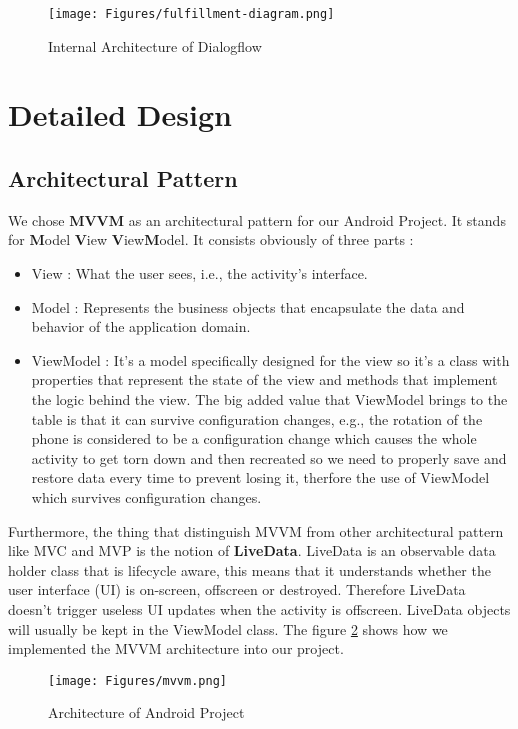 \begin{figure}[H]
\centering
\texttt{[image: Figures/fulfillment-diagram.png]}
\caption{Internal Architecture of Dialogflow}
\label{fig:dialogflow inetrnal}
\end{figure}
\section{Detailed Design}
\subsection{Architectural Pattern}
We chose \textbf{MVVM} as an architectural pattern for our Android Project. It stands for \textbf{M}odel \textbf{V}iew \textbf{V}iew\textbf{M}odel. It consists obviously of three parts : \begin{itemize}
    \item View : What the user sees, i.e., the activity's interface.
    \item Model : Represents the business objects that encapsulate the data and behavior of the application domain.
    \item ViewModel : It's a model specifically designed for the view so it's a class with properties that represent the state of the view and methods that implement the logic behind the view. The big added value that ViewModel brings to the table is that it can survive configuration changes, e.g., the rotation of the phone is considered to be a configuration change which causes the whole activity to get torn down and then recreated so we need to properly save and restore data every time to prevent losing it, therfore the use of ViewModel which survives configuration changes.
\end{itemize}
Furthermore, the thing that distinguish MVVM from other architectural pattern like MVC and MVP is the notion of \textbf{LiveData}. LiveData is an observable data holder class that is lifecycle aware, this means that it understands whether the user interface (UI) is on-screen, offscreen or destroyed. Therefore LiveData doesn't trigger useless UI updates when the activity is offscreen. LiveData objects will usually be kept in the ViewModel class. The figure \ref{fig:mvvm} shows how we implemented the MVVM architecture into our project. 
\begin{figure}[H]
\centering
\texttt{[image: Figures/mvvm.png]}
\caption{Architecture of Android Project}
\label{fig:mvvm}
\end{figure}
